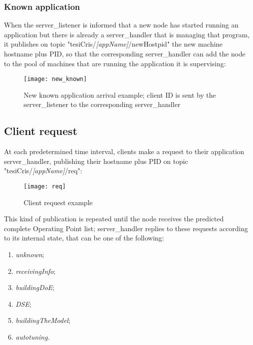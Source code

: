 \subsubsection{Known application}\label{knownApp}

When the server\_listener is informed that a new node has started running an application but there is already a ser\-ver\_han\-dler that is managing that program, it publishes on topic "tesiCris/\textit{[appName]}/newHostpid" the new machine hostname plus PID, so that the corresponding server\_handler can add the node to the pool of machines that are running the application it is supervising:

\begin{figure}[H]

    \centering
    \texttt{[image: new\_known]}
    \caption{New known application arrival example; client ID is sent by the server\_listener to the corresponding server\_handler}
    
\end{figure}





\subsection{Client request}\label{clientReq}

At each predetermined time interval, clients make a request to their application server\_handler, publishing their hostname plus PID on topic "tesiCris/\textit{[appName]}/req":

\begin{figure}[H]

    \centering
    \texttt{[image: req]}
    \caption{Client request example}
    
\end{figure}

This kind of publication is repeated until the node receives the predicted complete Operating Point list; server\_handler replies to these requests according to its internal state, that can be one of the following:

\begin{enumerate}

    \item \textit{unknown};

    \item \textit{receivingInfo};

    \item \textit{buildingDoE};

    \item \textit{DSE};

    \item \textit{buildingTheModel};

    \item \textit{autotuning}.

\end{enumerate}


